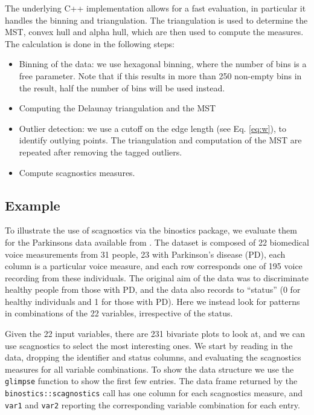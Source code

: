 The underlying C++ implementation allows for a fast evaluation, in
particular it handles the binning and triangulation. The triangulation
is used to determine the MST, convex hull and alpha hull, which are then
used to compute the measures. The calculation is done in the following
steps:

\begin{itemize}
\tightlist
\item
  Binning of the data: we use hexagonal binning, where the number of
  bins is a free parameter. Note that if this results in more than 250
  non-empty bins in the result, half the number of bins will be used
  instead.
\item
  Computing the Delaunay triangulation and the MST
\item
  Outlier detection: we use a cutoff on the edge length (see Eq.
  \ref{eq:w}), to identify outlying points. The triangulation and
  computation of the MST are repeated after removing the tagged
  outliers.
\item
  Compute scagnostics measures.
\end{itemize}

\hypertarget{example}{%
\subsection{Example}\label{example}}

To illustrate the use of scagnostics via the binostics package, we
evaluate them for the Parkinsons data \citep{parkinsons} available from
\citet{uci_parkinsons}. The dataset is composed of 22 biomedical voice
measurements from 31 people, 23 with Parkinson's disease (PD), each
column is a particular voice measure, and each row corresponds one of
195 voice recording from these individuals. The original aim of the data
was to discriminate healthy people from those with PD, and the data also
records to ``status'' (0 for healthy individuals and 1 for those with
PD). Here we instead look for patterns in combinations of the 22
variables, irrespective of the status.

Given the 22 input variables, there are 231 bivariate plots to look at,
and we can use scagnostics to select the most interesting ones. We start
by reading in the data, dropping the identifier and status columns, and
evaluating the scagnostics measures for all variable combinations. To
show the data structure we use the \texttt{glimpse} function to show the
first few entries. The data frame returned by the
\texttt{binostics::scagnostics} call has one column for each scagnostics
measure, and \texttt{var1} and \texttt{var2} reporting the corresponding
variable combination for each entry.

